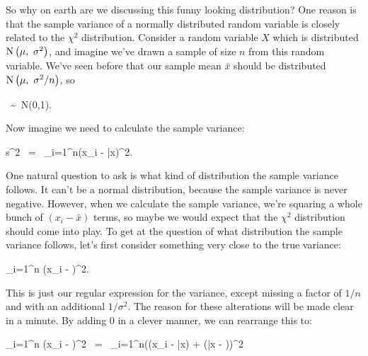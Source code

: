 So why on earth are we discussing this funny looking distribution?  One reason is that the sample variance of a normally distributed random variable is closely related to the $\chi^2$ distribution.  Consider a random variable $X$ which is distributed ${\rm N}\left(\mu,\ \sigma^2\right)$, and imagine we've drawn a sample of size $n$ from this random variable.  We've seen before that our sample mean $\bar{x}$ should be distributed ${\rm N}\left(\mu,\ \sigma^2/n\right)$, so



\bel

 \ \sim \  {\rm N}\left(0,1\right).

\eel

Now imagine we need to calculate the sample variance:



\bel

s^2 \ = \  \sum_{i=1}^n{\left(x_i - \bar{x}\right)^2}.

\eel

One natural question to ask is what kind of distribution the sample variance follows.  It can't be a normal distribution, because the sample variance is never negative.  However, when we calculate the sample variance, we're squaring a whole bunch of $(x_i - \bar{x})$ terms, so maybe we would expect that the $\chi^2$ distribution should come into play.  To get at the question of what distribution the sample variance follows,  let's first consider something very close to the true variance:



\bel

\sum_{i=1}^n \left(x_i - \mu\right)^2.

\eel

This is just our regular expression for the variance, except missing a factor of $1/n$ and with an additional $1/\sigma^2$.  The reason for these alterations will be made clear in a minute.  By adding 0 in a clever manner, we can rearrange this to:



\bel

\sum_{i=1}^n \left(x_i - \mu\right)^2 \ = \ \sum_{i=1}^n\left(\left(x_i - \bar{x}\right) + \left(\bar{x} - \mu\right)\right)^2

\eel

\bel

